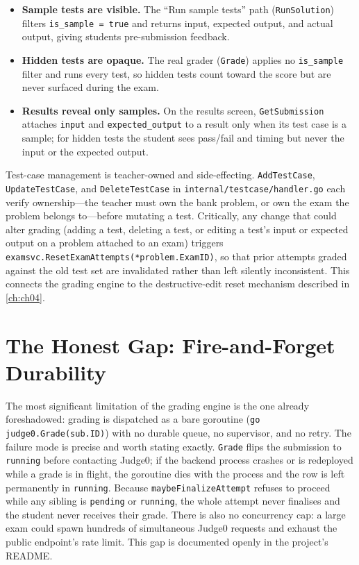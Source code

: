 \begin{itemize}[leftmargin=1.4em]
  \item \textbf{Sample tests are visible.} The ``Run sample tests'' path
  (\texttt{RunSolution}) filters \texttt{is\_sample = true} and returns input, expected output,
  and actual output, giving students pre-submission feedback.
  \item \textbf{Hidden tests are opaque.} The real grader (\texttt{Grade}) applies no
  \texttt{is\_sample} filter and runs every test, so hidden tests count toward the score but are
  never surfaced during the exam.
  \item \textbf{Results reveal only samples.} On the results screen,
  \texttt{GetSubmission} attaches \texttt{input} and \texttt{expected\_output} to a result only
  when its test case is a sample; for hidden tests the student sees pass/fail and timing but never
  the input or the expected output.
\end{itemize}

Test-case management is teacher-owned and side-effecting. \texttt{AddTestCase},
\texttt{UpdateTestCase}, and \texttt{DeleteTestCase} in \texttt{internal/testcase/handler.go}
each verify ownership---the teacher must own the bank problem, or own the exam the problem belongs
to---before mutating a test. Critically, any change that could alter grading (adding a test,
deleting a test, or editing a test's input or expected output on a problem attached to an exam)
triggers \texttt{examsvc.ResetExamAttempts(*problem.ExamID)}, so that prior attempts graded
against the old test set are invalidated rather than left silently inconsistent. This connects the
grading engine to the destructive-edit reset mechanism described in \cref{ch:ch04}.

\section{The Honest Gap: Fire-and-Forget Durability}\label{sec:grading-queue}

The most significant limitation of the grading engine is the one already foreshadowed: grading is
dispatched as a bare goroutine (\texttt{go judge0.Grade(sub.ID)}) with no durable queue, no
supervisor, and no retry. The failure mode is precise and worth stating exactly. \texttt{Grade}
flips the submission to \texttt{running} before contacting Judge0; if the backend process crashes
or is redeployed while a grade is in flight, the goroutine dies with the process and the row is
left permanently in \texttt{running}. Because \texttt{maybeFinalizeAttempt} refuses to proceed
while any sibling is \texttt{pending} or \texttt{running}, the whole attempt never finalises and
the student never receives their grade. There is also no concurrency cap: a large exam could spawn
hundreds of simultaneous Judge0 requests and exhaust the public endpoint's rate limit. This gap is
documented openly in the project's README.

